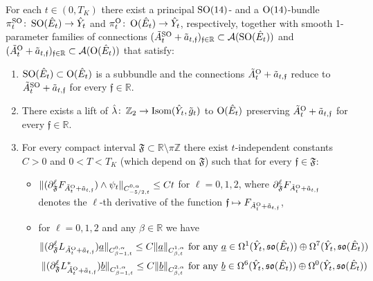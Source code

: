 \documentclass[11pt,a4paper]{scrartcl}
\newcommand{\col}{\colon \thinspace}
\newcommand{\VertWHt}[3]{\Vert_{C^{{#1},\alpha}_{{#2},t}{#3}}}
\newcommand{\SO}{\textup{SO}}
\renewcommand{\O}{\textup{O}}
\numberwithin{equation}{section}
\theoremstyle{plain}
\theoremstyle{definition}
\theoremstyle{remark}
\begin{document}
\begin{proposition}\label{prop:example18_almost-instantons+estimates}
For each $t\in (0,T_K)$ there exist a principal $\SO(14)$- and a $\O(14)$-bundle $\pi_t^{\SO} \col \SO(\hat{E}_t) \to \hat{Y}_t$ and $\pi_t^\O \col \O(\hat{E}_t) \to \hat{Y}_t$, respectively, together with smooth 1-parameter families of connections $(\tilde{A}_t^\SO + \tilde{a}_{t,\mathfrak{f}})_{\mathfrak{f}\in \mathbb{R}} \subset \mathcal{A}(\SO(\hat{E}_t))$ and $(\tilde{A}_t^\O + \tilde{a}_{t,\mathfrak{f}})_{\mathfrak{f}\in \mathbb{R}} \subset \mathcal{A}(\O(\hat{E}_t))$ that satisfy:
\begin{enumerate}
\item $\SO(\hat{E}_{t})\subset \O(\hat{E}_{t})$ is a subbundle and the connections $\tilde{A}_{t}^\O + \tilde{a}_{t,\mathfrak{f}}$ reduce to $\tilde{A}_{t}^{\SO}+\tilde{a}_{t,\mathfrak{f}}$ for every $\mathfrak{f}\in \mathbb{R}$.
\item There exists a lift of $\hat{\lambda} \col \mathbb{Z}_2 \to \textup{Isom}(\hat{Y}_t,\tilde{g}_t)$ to $\O(\hat{E}_{t})$ preserving $\tilde{A}_{t}^{\O}+\tilde{a}_{t,\mathfrak{f}}$ for every $\mathfrak{f}\in \mathbb{R}$.
\item For every compact interval $\mathfrak{F}\subset \mathbb{R}\setminus \pi \mathbb{Z}$ there exist $t$-independent constants $C>0$ and $0<T<T_K$ (which depend on $\mathfrak{F}$) such that for every $\mathfrak{f}\in \mathfrak{F}$:
\begin{itemize}
\item $\Vert (\partial_\mathfrak{F}^\ell F_{\tilde{A}_{t}^{\O}+\tilde{a}_{t,\mathfrak{f}}})\wedge\psi_t \VertWHt{0}{-5/2}{} \leq C t$ for $\ell =0,1,2$, where $\partial_\mathfrak{F}^\ell F_{\tilde{A}_{t}^{\O}+\tilde{a}_{t,\mathfrak{f}}}$ denotes the $\ell$-th derivative of the function $\mathfrak{f} \mapsto F_{\tilde{A}_{t}^{\O}+\tilde{a}_{t,\mathfrak{f}}}$,
\item for $\ell =0,1,2$ and any $\beta \in \mathbb{R}$ we have
\begin{align*}
\Vert (\partial_\mathfrak{F}^\ell L_{\tilde{A}_t^\O+\tilde{a}_{t,\mathfrak{f}}}) \underline{a} \VertWHt{0}{\beta-1}{} \leq C \Vert \underline{a} \VertWHt{1}{\beta}{} &\textup{ for any $\underline{a} \in \Omega^1(\hat{Y}_t,\mathfrak{so}(\hat{E}_t))\oplus \Omega^7(\hat{Y}_t,\mathfrak{so}(\hat{E}_t))$}\\
\Vert (\partial_\mathfrak{F}^\ell L^*_{\tilde{A}_t^\O+\tilde{a}_{t,\mathfrak{f}}}) \underline{b} \VertWHt{1}{\beta-1}{} \leq C \Vert \underline{b} \VertWHt{2}{\beta}{} &\textup{ for any $\underline{b} \in \Omega^6(\hat{Y}_t,\mathfrak{so}(\hat{E}_t))\oplus \Omega^0(\hat{Y}_t,\mathfrak{so}(\hat{E}_t))$}

\end{align*}
\end{itemize}
\end{enumerate}
\end{proposition}
\end{document}
